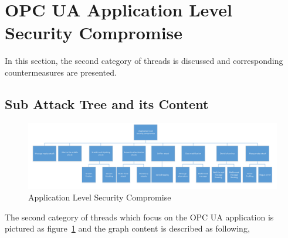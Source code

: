 \section{OPC UA Application Level Security Compromise}
In this section, the second category of threads is discussed and corresponding countermeasures are presented.  
\subsection{Sub Attack Tree and its Content}
 \begin{figure}[!htb]
	\centering
	\includegraphics[width=1.2\textwidth]{attack-tree-application}
		\caption{Application Level Security Compromise}
	\label{fig:attack-tree-application}
\end{figure}
The second category of threads which focus on the OPC UA application is pictured as figure~\ref{fig:attack-tree-application} and  the graph content is described as following,

